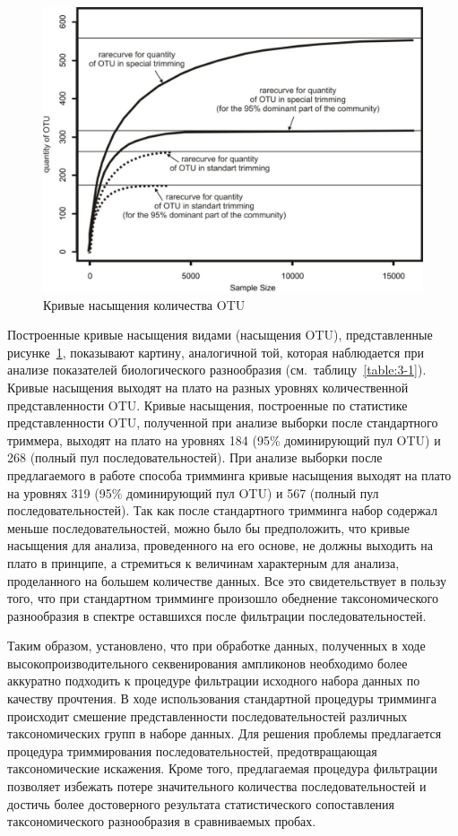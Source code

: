 \documentclass[a4paper,12pt,openany,final]{extreport}
\def\oldcaption{} \let\oldcaption=\caption
\def\caption{\stepcounter{captionsnum}\oldcaption}
\begin{document}
\begin{figure}[b!]\centering
\includegraphics[width=0.6\linewidth]{media/image7.jpeg}
\caption{Кривые насыщения количества OTU}\label{fig:3-1}
\end{figure}

Построенные кривые насыщения видами (насыщения OTU), представленные рисунке~\ref{fig:3-1}, показывают картину, аналогичной той, которая наблюдается при анализе показателей биологического разнообразия (см.~таблицу~\ref{table:3-1}). Кривые насыщения выходят на плато на разных уровнях количественной представленности OTU. Кривые насыщения, построенные по статистике представленности OTU, полученной при анализе выборки после стандартного триммера, выходят на плато на уровнях 184 (95\% доминирующий пул OTU) и 268 (полный пул последовательностей). При анализе выборки после предлагаемого в работе способа тримминга кривые насыщения выходят на плато на уровнях 319 (95\% доминирующий пул OTU) и 567 (полный пул последовательностей). Так как после стандартного тримминга набор содержал меньше последовательностей, можно было бы предположить, что кривые насыщения для анализа, проведенного на его основе, не должны выходить на плато в принципе, а стремиться к величинам характерным для анализа, проделанного на большем количестве данных. Все это свидетельствует в пользу того, что при стандартном тримминге произошло обеднение таксономического разнообразия в спектре оставшихся после фильтрации последовательностей.

Таким образом, установлено, что при обработке данных, полученных в ходе высокопроизводительного секвенирования ампликонов необходимо более аккуратно подходить к процедуре фильтрации исходного набора данных по качеству прочтения. В ходе использования стандартной процедуры тримминга происходит смешение представленности последовательностей различных таксономических групп в наборе данных. Для решения проблемы предлагается процедура триммирования последовательностей, предотвращающая таксономические искажения. Кроме того, предлагаемая процедура фильтрации позволяет избежать потере значительного количества последовательностей и достичь более достоверного результата статистического сопоставления таксономического разнообразия в сравниваемых пробах.
\end{document}
